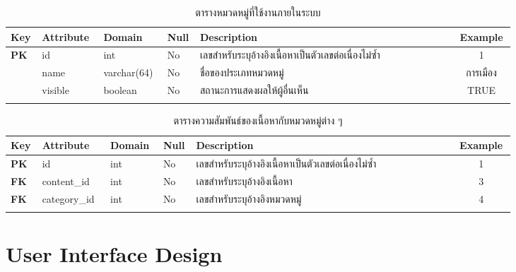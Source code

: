 \documentclass[12pt,oneside,openright,a4paper]{cpe-thai-project}
\begin{document}
\begin{longtable}{p{0.03\linewidth}|p{0.1\linewidth}|p{0.1\linewidth}|m{0.03\linewidth}|p{0.47\linewidth}|p{0.1\linewidth}}
  \caption{ตารางหมวดหมู่ที่ใช้งานภายในระบบ}\label{tbl:categories}  \\
  \hhline{======}
  \textbf{Key} & \textbf{Attribute} & \textbf{Domain} & \textbf{Null} & \textbf{Description} &\multicolumn{1}{c}{\textbf{Example}}  \\ \hline
  \endfirsthead
  \endhead
  \textbf{PK} & id      & int         & No & เลขสำหรับระบุอ้างอิงเนื้อหาเป็นตัวเลขต่อเนื่องไม่ซ้ำ      & \multicolumn{1}{c}{1}          \\ \hline
  \textbf{}   & name    & varchar(64) & No & ชื่อของประเภทหมวดหมู่                          & \multicolumn{1}{c}{การเมือง}     \\ \hline
  \textbf{}   & visible & boolean     & No & สถานะการแสดงผลให้ผู้อื่นเห็น                     & \multicolumn{1}{c}{TRUE}        \\ \hhline{======}
\end{longtable}

\begin{longtable}{p{0.03\linewidth}|p{0.12\linewidth}|p{0.08\linewidth}|m{0.03\linewidth}|p{0.47\linewidth}|p{0.1\linewidth}}
  \caption{ตารางความสัมพันธ์ของเนื้อหากับหมวดหมู่ต่าง ๆ}\label{tbl:content_categories}  \\
  \hhline{======}
  \textbf{Key} & \textbf{Attribute} & \textbf{Domain} & \textbf{Null} & \textbf{Description} &\multicolumn{1}{c}{\textbf{Example}}  \\ \hline
  \endfirsthead
  \endhead
  \textbf{PK} & id      & int         & No & เลขสำหรับระบุอ้างอิงเนื้อหาเป็นตัวเลขต่อเนื่องไม่ซ้ำ      & \multicolumn{1}{c}{1}          \\ \hline
  \textbf{FK}   & content\_id    & int & No & เลขสำหรับระบุอ้างอิงเนื้อหา                          & \multicolumn{1}{c}{3}     \\ \hline
  \textbf{FK}   & category\_id & int     & No & เลขสำหรับระบุอ้างอิงหมวดหมู่                     & \multicolumn{1}{c}{4}        \\ \hhline{======}
\end{longtable}

\section{User Interface Design}
\end{document}
